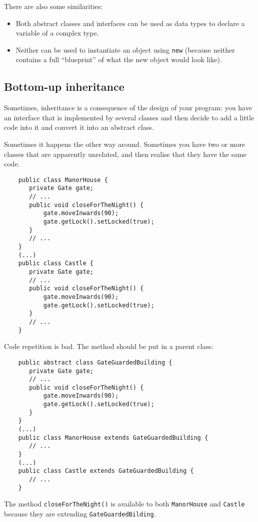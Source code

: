 {There are also some similarities: 

\begin{itemize}
\item Both abstract classes and interfaces can be used as data
  types to declare a variable of a complex type.
\item Neither can be used to instantiate an object using \verb+new+
  (because neither contains a full ``blueprint'' of what the new
  object would look like). 
\end{itemize}

\subsection{Bottom-up inheritance}
\label{sec:boot-up-inher}

Sometimes, inheritance is a consequence of the design of your
program: you have an interface that is implemented by several classes
and then decide to add a little code into it and convert it into an
abstract class. 

Sometimes it happens the other way around. Sometimes you have two or
more classes that are apparently unrelated, and then realise that they
have the same code. 

\begin{verbatim}
    public class ManorHouse {
       private Gate gate;
       // ...
       public void closeForTheNight() {
           gate.moveInwards(90);
           gate.getLock().setLocked(true);
       }
       // ...
    }
    (...)
    public class Castle {
       private Gate gate;
       // ...
       public void closeForTheNight() {
           gate.moveInwards(90);
           gate.getLock().setLocked(true);
       }
       // ...
    }       
\end{verbatim}

Code repetition is bad. The method should be put in a parent class: 

\begin{verbatim}
    public abstract class GateGuardedBuilding {
       private Gate gate;
       // ...
       public void closeForTheNight() {
           gate.moveInwards(90);
           gate.getLock().setLocked(true);
       }
    }
    (...)
    public class ManorHouse extends GateGuardedBuilding {
       // ...
    }
    (...)
    public class Castle extends GateGuardedBuilding {
       // ...
    }       
\end{verbatim}

The method \verb+closeForTheNight()+ is available to both
\verb+ManorHouse+ and \verb+Castle+ because they are extending
\verb+GateGuardedBilding+. 

}
